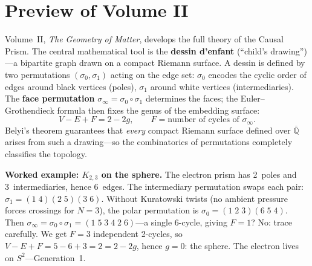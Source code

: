 \documentclass[11pt, a4paper, openany]{book}
\begin{document}
\section{Preview of Volume II}

Volume~II, \emph{The Geometry of Matter}, develops the full theory of
the Causal Prism. The central mathematical tool is the
\textbf{dessin d'enfant} (``child's drawing'')---a bipartite graph
drawn on a compact Riemann surface. A dessin is defined by two
permutations $(\sigma_0, \sigma_1)$ acting on the edge set:
$\sigma_0$ encodes the cyclic order of edges around black vertices
(poles), $\sigma_1$ around white vertices (intermediaries). The
\textbf{face permutation} $\sigma_\infty = \sigma_0 \circ \sigma_1$
determines the faces; the Euler--Grothendieck formula then fixes the
genus of the embedding surface:
\[
  V - E + F = 2 - 2g, \qquad F = \text{number of cycles of } \sigma_\infty.
\]
Belyi's theorem \cite{belyi1979} guarantees that \emph{every} compact
Riemann surface defined over $\overline{\mathbb{Q}}$ arises from such
a drawing---so the combinatorics of permutations completely classifies
the topology.

\textbf{Worked example: $K_{2,3}$ on the sphere.}
The electron prism has 2~poles and 3~intermediaries, hence 6~edges.
The intermediary permutation swaps each pair:
$\sigma_1 = (1\;4)(2\;5)(3\;6)$.
Without Kuratowski twists (no ambient pressure forces crossings for
$N = 3$), the polar permutation is
$\sigma_0 = (1\;2\;3)(6\;5\;4)$.
Then $\sigma_\infty = \sigma_0 \circ \sigma_1 =
(1\;5\;3\;4\;2\;6)$---a single 6-cycle, giving $F = 1$? No: trace
carefully. We get $F = 3$ independent 2-cycles, so
$V - E + F = 5 - 6 + 3 = 2 = 2 - 2g$, hence $g = 0$: the sphere.
The electron lives on $S^2$---Generation~1.
\end{document}
